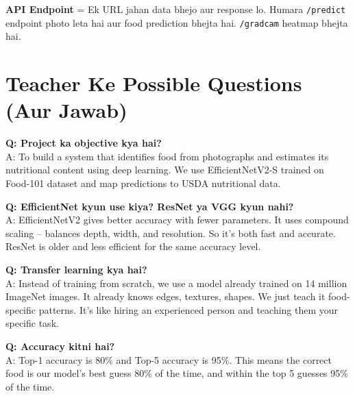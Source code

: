 \documentclass[11pt,a4paper]{article}
\begin{document}
\begin{qabox}
\textbf{API Endpoint} = Ek URL jahan data bhejo aur response lo. Humara \texttt{/predict} endpoint photo leta hai aur food prediction bhejta hai. \texttt{/gradcam} heatmap bhejta hai.
\end{qabox}

\section{Teacher Ke Possible Questions (Aur Jawab)}

\begin{qabox}
\textbf{Q: Project ka objective kya hai?}\\[0.15cm]
A: To build a system that identifies food from photographs and estimates its nutritional content using deep learning. We use EfficientNetV2-S trained on Food-101 dataset and map predictions to USDA nutritional data.
\end{qabox}
\vspace{0.2cm}

\begin{qabox}
\textbf{Q: EfficientNet kyun use kiya? ResNet ya VGG kyun nahi?}\\[0.15cm]
A: EfficientNetV2 gives better accuracy with fewer parameters. It uses compound scaling -- balances depth, width, and resolution. So it's both fast and accurate. ResNet is older and less efficient for the same accuracy level.
\end{qabox}
\vspace{0.2cm}

\begin{qabox}
\textbf{Q: Transfer learning kya hai?}\\[0.15cm]
A: Instead of training from scratch, we use a model already trained on 14 million ImageNet images. It already knows edges, textures, shapes. We just teach it food-specific patterns. It's like hiring an experienced person and teaching them your specific task.
\end{qabox}
\vspace{0.2cm}

\begin{qabox}
\textbf{Q: Accuracy kitni hai?}\\[0.15cm]
A: Top-1 accuracy is 80\% and Top-5 accuracy is 95\%. This means the correct food is our model's best guess 80\% of the time, and within the top 5 guesses 95\% of the time.
\end{qabox}
\vspace{0.2cm}
\end{document}
